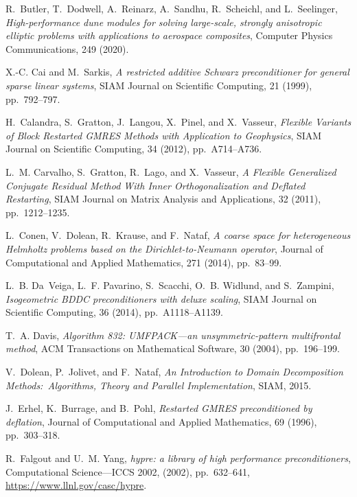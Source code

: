 \documentclass[3p,11pt]{elsarticle}
\newcommand\col{:}
\begin{document}
\begin{thebibliography}{10}
{\sc R.~Butler, T.~Dodwell, A.~Reinarz, A.~Sandhu, R.~Scheichl, and
  L.~Seelinger}, {\em High-performance dune modules for solving large-scale,
  strongly anisotropic elliptic problems with applications to aerospace
  composites}, Computer Physics Communications, 249 (2020).

{\sc X.-C. Cai and M.~Sarkis}, {\em {A restricted additive Schwarz
  preconditioner for general sparse linear systems}}, SIAM Journal on
  Scientific Computing, 21 (1999), pp.~792--797.

{\sc H.~Calandra, S.~Gratton, J.~Langou, X.~Pinel, and X.~Vasseur}, {\em
  {Flexible Variants of Block Restarted GMRES Methods with Application to
  Geophysics}}, SIAM Journal on Scientific Computing, 34 (2012),
  pp.~A714--A736.

{\sc L.~M. Carvalho, S.~Gratton, R.~Lago, and X.~Vasseur}, {\em {A Flexible
  Generalized Conjugate Residual Method With Inner Orthogonalization and
  Deflated Restarting}}, SIAM Journal on Matrix Analysis and Applications, 32
  (2011), pp.~1212--1235.

{\sc L.~Conen, V.~Dolean, R.~Krause, and F.~Nataf}, {\em {A coarse space for
  heterogeneous Helmholtz problems based on the Dirichlet-to-Neumann
  operator}}, Journal of Computational and Applied Mathematics, 271 (2014),
  pp.~83--99.

{\sc L.~B. Da~Veiga, L.~F. Pavarino, S.~Scacchi, O.~B. Widlund, and
  S.~Zampini}, {\em {Isogeometric BDDC preconditioners with deluxe scaling}},
  SIAM Journal on Scientific Computing, 36 (2014), pp.~A1118--A1139.

{\sc T.~A. Davis}, {\em Algorithm 832: {UMFPACK}—an unsymmetric-pattern
  multifrontal method}, ACM Transactions on Mathematical Software, 30 (2004),
  pp.~196--199.

{\sc V.~Dolean, P.~Jolivet, and F.~Nataf}, {\em An Introduction to Domain
  Decomposition Methods\col\ Algorithms, Theory and Parallel Implementation},
  SIAM, 2015.

{\sc J.~Erhel, K.~Burrage, and B.~Pohl}, {\em {Restarted GMRES preconditioned
  by deflation}}, Journal of Computational and Applied Mathematics, 69 (1996),
  pp.~303--318.

{\sc R.~Falgout and U.~M. Yang}, {\em \emph{hypre}: a library of high
  performance preconditioners}, Computational Science---ICCS 2002,  (2002),
  pp.~632--641, \url{https://www.llnl.gov/casc/hypre}.


\end{thebibliography}
\end{document}
